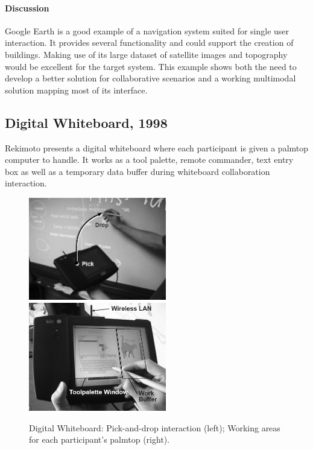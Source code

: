 \paragraph{Discussion}

Google Earth is a good example of a navigation system suited for single user interaction.
It provides several functionality and could support the creation of buildings.
Making use of its large dataset of satellite images and topography would be excellent
for the target system.
This example shows both the need to develop a better solution for collaborative scenarios
and a working multimodal solution mapping most of its interface.



\subsection{Digital Whiteboard, 1998}

Rekimoto \cite{WBOARD} presents a digital whiteboard where each participant is given
a palmtop computer to handle. It works as a tool palette, remote commander, text entry box as
well as a temporary data buffer during whiteboard collaboration interaction.

\begin{figure}[!ht]
	\centering
	\includegraphics[width=6cm]{gfx/wboard.png}
	\includegraphics[width=6cm]{gfx/wboard2.png}
	\caption{Digital Whiteboard:
		Pick-and-drop interaction (left);
		Working areas for each participant's palmtop (right).}
	\label{FIG-WBOARD}
\end{figure}

